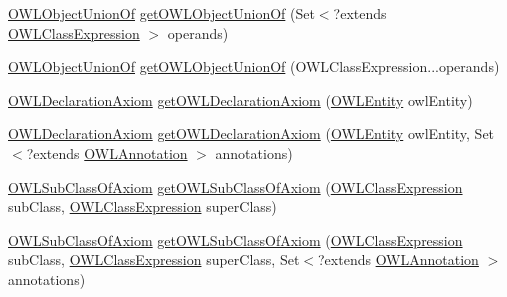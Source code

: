 \begin{DoxyCompactItemize}
\item 
\hyperlink{interfaceorg_1_1semanticweb_1_1owlapi_1_1model_1_1_o_w_l_object_union_of}{O\-W\-L\-Object\-Union\-Of} \hyperlink{interfaceorg_1_1semanticweb_1_1owlapi_1_1model_1_1_o_w_l_data_factory_a01e3be094d59cbc8a6debcf3e631779f}{get\-O\-W\-L\-Object\-Union\-Of} (Set$<$?extends \hyperlink{interfaceorg_1_1semanticweb_1_1owlapi_1_1model_1_1_o_w_l_class_expression}{O\-W\-L\-Class\-Expression} $>$ operands)
\item 
\hyperlink{interfaceorg_1_1semanticweb_1_1owlapi_1_1model_1_1_o_w_l_object_union_of}{O\-W\-L\-Object\-Union\-Of} \hyperlink{interfaceorg_1_1semanticweb_1_1owlapi_1_1model_1_1_o_w_l_data_factory_a3a930dcb2fe27d182d874cc3027973f3}{get\-O\-W\-L\-Object\-Union\-Of} (O\-W\-L\-Class\-Expression...\-operands)
\item 
\hyperlink{interfaceorg_1_1semanticweb_1_1owlapi_1_1model_1_1_o_w_l_declaration_axiom}{O\-W\-L\-Declaration\-Axiom} \hyperlink{interfaceorg_1_1semanticweb_1_1owlapi_1_1model_1_1_o_w_l_data_factory_aabe7530229304da31a874566a3b21d6f}{get\-O\-W\-L\-Declaration\-Axiom} (\hyperlink{interfaceorg_1_1semanticweb_1_1owlapi_1_1model_1_1_o_w_l_entity}{O\-W\-L\-Entity} owl\-Entity)
\item 
\hyperlink{interfaceorg_1_1semanticweb_1_1owlapi_1_1model_1_1_o_w_l_declaration_axiom}{O\-W\-L\-Declaration\-Axiom} \hyperlink{interfaceorg_1_1semanticweb_1_1owlapi_1_1model_1_1_o_w_l_data_factory_ac5e97d1bfe8be4895cd6e917b4e9a548}{get\-O\-W\-L\-Declaration\-Axiom} (\hyperlink{interfaceorg_1_1semanticweb_1_1owlapi_1_1model_1_1_o_w_l_entity}{O\-W\-L\-Entity} owl\-Entity, Set$<$?extends \hyperlink{interfaceorg_1_1semanticweb_1_1owlapi_1_1model_1_1_o_w_l_annotation}{O\-W\-L\-Annotation} $>$ annotations)
\item 
\hyperlink{interfaceorg_1_1semanticweb_1_1owlapi_1_1model_1_1_o_w_l_sub_class_of_axiom}{O\-W\-L\-Sub\-Class\-Of\-Axiom} \hyperlink{interfaceorg_1_1semanticweb_1_1owlapi_1_1model_1_1_o_w_l_data_factory_a9a82fac9e626c03650f19621f1ce0e0c}{get\-O\-W\-L\-Sub\-Class\-Of\-Axiom} (\hyperlink{interfaceorg_1_1semanticweb_1_1owlapi_1_1model_1_1_o_w_l_class_expression}{O\-W\-L\-Class\-Expression} sub\-Class, \hyperlink{interfaceorg_1_1semanticweb_1_1owlapi_1_1model_1_1_o_w_l_class_expression}{O\-W\-L\-Class\-Expression} super\-Class)
\item 
\hyperlink{interfaceorg_1_1semanticweb_1_1owlapi_1_1model_1_1_o_w_l_sub_class_of_axiom}{O\-W\-L\-Sub\-Class\-Of\-Axiom} \hyperlink{interfaceorg_1_1semanticweb_1_1owlapi_1_1model_1_1_o_w_l_data_factory_ac31c29d4c03763e8d91633214c1f5360}{get\-O\-W\-L\-Sub\-Class\-Of\-Axiom} (\hyperlink{interfaceorg_1_1semanticweb_1_1owlapi_1_1model_1_1_o_w_l_class_expression}{O\-W\-L\-Class\-Expression} sub\-Class, \hyperlink{interfaceorg_1_1semanticweb_1_1owlapi_1_1model_1_1_o_w_l_class_expression}{O\-W\-L\-Class\-Expression} super\-Class, Set$<$?extends \hyperlink{interfaceorg_1_1semanticweb_1_1owlapi_1_1model_1_1_o_w_l_annotation}{O\-W\-L\-Annotation} $>$ annotations)

\end{DoxyCompactItemize}
